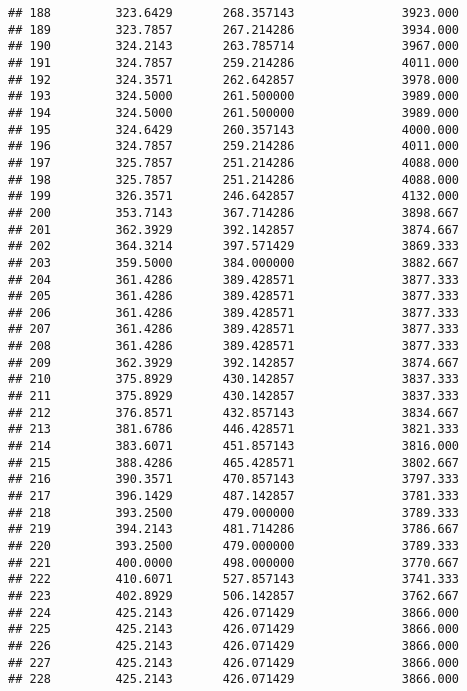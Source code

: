 \documentclass[]{article}
\begin{document}
\begin{verbatim}
## 188         323.6429       268.357143               3923.000
## 189         323.7857       267.214286               3934.000
## 190         324.2143       263.785714               3967.000
## 191         324.7857       259.214286               4011.000
## 192         324.3571       262.642857               3978.000
## 193         324.5000       261.500000               3989.000
## 194         324.5000       261.500000               3989.000
## 195         324.6429       260.357143               4000.000
## 196         324.7857       259.214286               4011.000
## 197         325.7857       251.214286               4088.000
## 198         325.7857       251.214286               4088.000
## 199         326.3571       246.642857               4132.000
## 200         353.7143       367.714286               3898.667
## 201         362.3929       392.142857               3874.667
## 202         364.3214       397.571429               3869.333
## 203         359.5000       384.000000               3882.667
## 204         361.4286       389.428571               3877.333
## 205         361.4286       389.428571               3877.333
## 206         361.4286       389.428571               3877.333
## 207         361.4286       389.428571               3877.333
## 208         361.4286       389.428571               3877.333
## 209         362.3929       392.142857               3874.667
## 210         375.8929       430.142857               3837.333
## 211         375.8929       430.142857               3837.333
## 212         376.8571       432.857143               3834.667
## 213         381.6786       446.428571               3821.333
## 214         383.6071       451.857143               3816.000
## 215         388.4286       465.428571               3802.667
## 216         390.3571       470.857143               3797.333
## 217         396.1429       487.142857               3781.333
## 218         393.2500       479.000000               3789.333
## 219         394.2143       481.714286               3786.667
## 220         393.2500       479.000000               3789.333
## 221         400.0000       498.000000               3770.667
## 222         410.6071       527.857143               3741.333
## 223         402.8929       506.142857               3762.667
## 224         425.2143       426.071429               3866.000
## 225         425.2143       426.071429               3866.000
## 226         425.2143       426.071429               3866.000
## 227         425.2143       426.071429               3866.000
## 228         425.2143       426.071429               3866.000

\end{verbatim}
\end{document}
